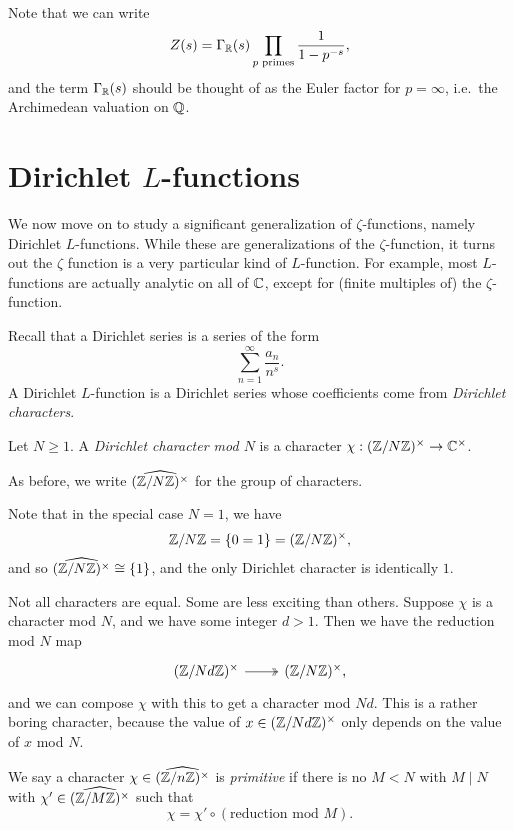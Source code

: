 \documentclass[a4paper]{article}
\begin{document}
Note that we can write
\[
  Z(s) = \Gamma_{\mathbb{R}}(s) \prod_{p\text{ primes}} \frac{1}{1 - p^{-s}},
\]
and the term $\Gamma_{\mathbb{R}}(s)$ should be thought of as the Euler factor for $p = \infty$, i.e.\ the Archimedean valuation on $\mathbb{Q}$.

\section{Dirichlet \texorpdfstring{$L$}{L}-functions}
We now move on to study a significant generalization of $\zeta$-functions, namely Dirichlet $L$-functions. While these are generalizations of the $\zeta$-function, it turns out the $\zeta$ function is a very particular kind of $L$-function. For example, most $L$-functions are actually analytic on all of $\mathbb{C}$, except for (finite multiples of) the $\zeta$-function.

Recall that a Dirichlet series is a series of the form
\[
  \sum_{n = 1}^\infty \frac{a_n}{n^s}.
\]
A Dirichlet $L$-function is a Dirichlet series whose coefficients come from \emph{Dirichlet characters}.

\begin{defi}
  Let $N \geq 1$. A \emph{Dirichlet character mod $N$} is a character $\chi: (\mathbb{Z}/N\mathbb{Z})^\times \to \mathbb{C}^\times$.

  As before, we write $\widehat{(\mathbb{Z}/N\mathbb{Z})^\times}$ for the group of characters.
\end{defi}
Note that in the special case $N = 1$, we have
\[
  \mathbb{Z}/N\mathbb{Z} = \{0 = 1\} = (\mathbb{Z}/N\mathbb{Z})^\times,
\]
and so $\widehat{(\mathbb{Z}/N\mathbb{Z})^\times} \cong \{1\}$, and the only Dirichlet character is identically $1$.

Not all characters are equal. Some are less exciting than others. Suppose $\chi$ is a character mod $N$, and we have some integer $d > 1$. Then we have the reduction mod $N$ map
\[
  \begin{tikzcd}
    (\Z/Nd\Z)^\times \ar[r, two heads] & (\Z/N\Z)^\times,
  \end{tikzcd}
\]
and we can compose $\chi$ with this to get a character mod $Nd$. This is a rather boring character, because the value of $x \in (\mathbb{Z}/Nd\mathbb{Z})^\times$ only depends on the value of $x$ mod $N$.
\begin{defi}
  We say a character $\chi \in \widehat{(\mathbb{Z}/n\mathbb{Z})^\times}$ is \emph{primitive} if there is no $M < N$ with $M \mid N$ with $\chi' \in \widehat{(\mathbb{Z}/M\mathbb{Z})^\times}$ such that
  \[
    \chi = \chi' \circ (\text{reduction mod $M$}).
  \]
\end{defi}
\end{document}
